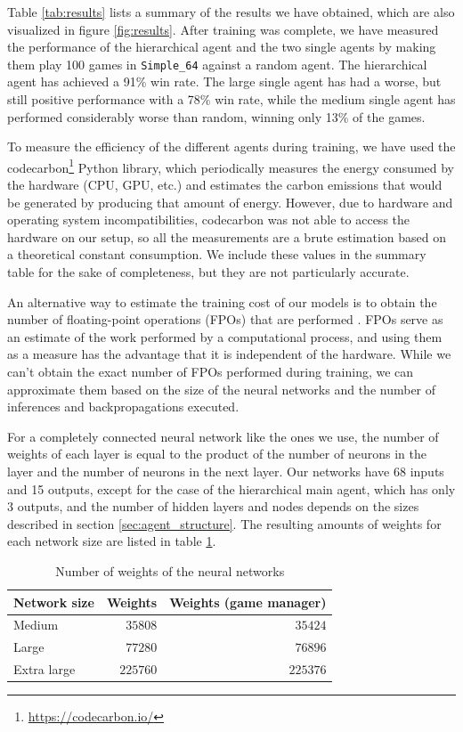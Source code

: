 Table \ref{tab:results} lists a summary of the results we have obtained, which are also visualized in figure \ref{fig:results}. After training was complete, we have measured the performance of the hierarchical agent and the two single agents by making them play 100 games in \texttt{Simple\_64} against a random agent. The hierarchical agent has achieved a 91\% win rate. The large single agent has had a worse, but still positive performance with a 78\% win rate, while the medium single agent has performed considerably worse than random, winning only 13\% of the games.

To measure the efficiency of the different agents during training, we have used the codecarbon\footnote{\url{https://codecarbon.io/}} Python library, which periodically measures the energy consumed by the hardware (CPU, GPU, etc.) and estimates the carbon emissions that would be generated by producing that amount of energy. However, due to hardware and operating system incompatibilities, codecarbon was not able to access the hardware on our setup, so all the measurements are a brute estimation based on a theoretical constant consumption. We include these values in the summary table for the sake of completeness, but they are not particularly accurate.

An alternative way to estimate the training cost of our models is to obtain the number of floating-point operations (FPOs) that are performed \cite{Schwartz:2019}. FPOs serve as an estimate of the work performed by a computational process, and using them as a measure has the advantage that it is independent of the hardware. While we can't obtain the exact number of FPOs performed during training, we can approximate them based on the size of the neural networks and the number of inferences and backpropagations executed.

For a completely connected neural network like the ones we use, the number of weights of each layer is equal to the product of the number of neurons in the layer and the number of neurons in the next layer. Our networks have 68 inputs and 15 outputs, except for the case of the hierarchical main agent, which has only 3 outputs, and the number of hidden layers and nodes depends on the sizes described in section \ref{sec:agent_structure}. The resulting amounts of weights for each network size are listed in table \ref{tab:weights}.

\begin{table}[h]
    \centering
    \begin{tabular}{ l|r r }
        Network size & Weights & Weights (game manager) \\
        \hline
        Medium & $35808$ & $35424$ \\
        Large & $77280$ & $76896$ \\
        Extra large & $225760$ & $225376$ \\
    \end{tabular}
    \caption{Number of weights of the neural networks}
    \label{tab:weights}
\end{table}


